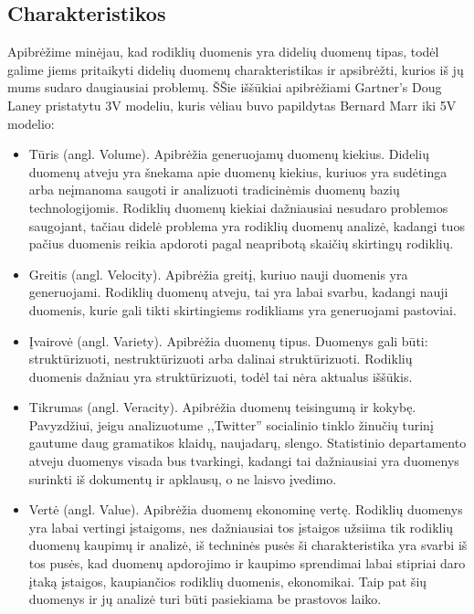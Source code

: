 \documentclass{VUMIFPSkursinis}
\begin{document}
\subsection{Charakteristikos}

Apibrėžime minėjau, kad rodiklių duomenis yra didelių duomenų tipas, todėl galime jiems pritaikyti didelių duomenų charakteristikas ir apsibrėžti, kurios iš jų 
mums sudaro daugiausiai problemų. ŠŠie iššūkiai apibrėžiami Gartner's Doug Laney pristatytu 3V modeliu\cite{laney20013d}, kuris vėliau buvo papildytas Bernard Marr iki 5V modelio\cite{marr2014big}:
\begin{itemize}
    \item Tūris (angl. Volume). Apibrėžia generuojamų duomenų kiekius. Didelių duomenų atveju yra šnekama apie duomenų kiekius, kuriuos yra sudėtinga arba neįmanoma saugoti 
    ir analizuoti tradicinėmis duomenų bazių technologijomis. Rodiklių duomenų kiekiai dažniausiai nesudaro problemos saugojant, tačiau didelė problema yra rodiklių duomenų analizė, 
    kadangi tuos pačius duomenis reikia apdoroti pagal neapribotą skaičių skirtingų rodiklių.
    \item Greitis (angl. Velocity). Apibrėžia greitį, kuriuo nauji duomenis yra generuojami. Rodiklių duomenų atveju, tai yra labai svarbu, kadangi nauji duomenis, kurie gali 
    tikti skirtingiems rodikliams yra generuojami pastoviai.
    \item Įvairovė (angl. Variety). Apibrėžia duomenų tipus. Duomenys gali būti: struktūrizuoti, nestruktūrizuoti arba dalinai struktūrizuoti\cite{zikopoulos2011understanding}. 
    Rodiklių duomenis dažniau yra struktūrizuoti, todėl tai nėra aktualus iššūkis.
    \item Tikrumas (angl. Veracity). Apibrėžia duomenų teisingumą ir kokybę. Pavyzdžiui, jeigu analizuotume ,,Twitter'' socialinio tinklo žinučių turinį gautume daug gramatikos klaidų, naujadarų, slengo. 
    Statistinio departamento atveju duomenys visada bus tvarkingi, kadangi tai dažniausiai yra duomenys surinkti iš dokumentų ir apklausų, o ne laisvo įvedimo.
    \item Vertė (angl. Value). Apibrėžia duomenų ekonominę vertę. Rodiklių duomenys yra labai vertingi įstaigoms, nes dažniausiai tos įstaigos užsiima tik rodiklių duomenų kaupimų ir analizė, iš techninės pusės
    ši charakteristika yra svarbi iš tos pusės, kad duomenų apdorojimo ir kaupimo sprendimai labai stipriai daro įtaką įstaigos, kaupiančios rodiklių duomenis, ekonomikai. Taip pat šių duomenys ir jų 
    analizė turi būti pasiekiama be prastovos laiko.
\end{itemize}
\end{document}
